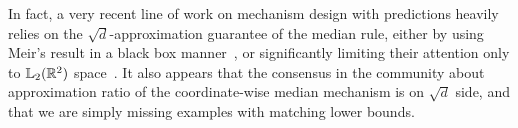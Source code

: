 In fact, a very recent line of work on mechanism design with predictions heavily relies on the $\sqrt{d}$-approximation guarantee of the median rule, either by using Meir's result in a black box manner~\cite{barak2024mac}, or significantly limiting their attention only to $\lqnorm[2](\reals^2)$ space~\cite{AgrawalBGTX22,BalkanskiGS24,ChristodoulouSV24}. It also appears that the consensus in the community about 
approximation ratio of the coordinate-wise median mechanism is on $\sqrt{d}$ side, and that we are simply missing examples with matching lower bounds. 

%
%
%
%
%
%
%
%
%
